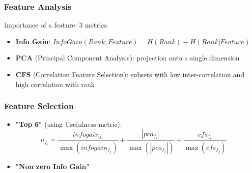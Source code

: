 
\begin{frame}
\frametitle{Feature Analysis}
Importance of a feature: 3 metrics
\begin{itemize}
\item \textbf{Info Gain}:
{\small $ InfoGain(Rank,Feature) = H(Rank) - H(Rank | Feature) $}
\item \textbf{PCA} (Principal Component Analysis): projection onto a single dimension
\item \textbf{CFS} (Correlation Feature Selection): subsets with low inter-correlation and high correlation with rank
\end{itemize}
\end{frame}

\begin{frame}
\frametitle{Feature Selection}
\begin{itemize}
\item \textbf{"Top 6"} (using Usefulness metric):
$$u_{f_i} = \frac{infogain_{f_i}}{\max(infogain_{f_j})} + \frac{|pca_{f_i}|}{\max(|pca_{f_j}|)} + \frac{cfs_{f_i}}{\max(cfs_{f_j})}$$

\item \textbf{"Non zero Info Gain"}
\end{itemize}



\end{frame}
